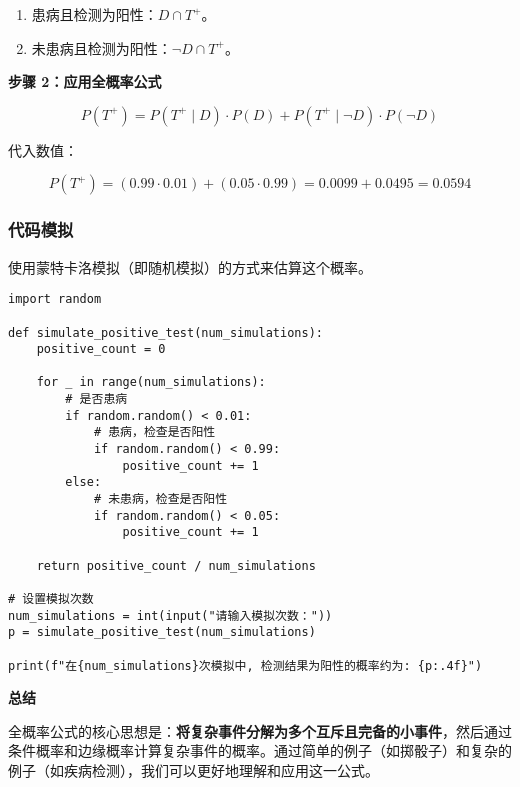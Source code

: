 \documentclass[a4paper]{ctexbook}
\begin{document}
\begin{enumerate}[label=\arabic*.]
\item 患病且检测为阳性：\( D \cap T^+ \)。
\item 未患病且检测为阳性：\( \neg D \cap T^+ \)。
\end{enumerate}

\textbf{步骤 2：应用全概率公式}

\[
P(T^+) = P(T^+ \mid D) \cdot P(D) + P(T^+ \mid \neg D) \cdot P(\neg D)
\]

代入数值：

\[
P(T^+) = (0.99 \cdot 0.01) + (0.05 \cdot 0.99) = 0.0099 + 0.0495 = 0.0594
\]


\subsubsection*{代码模拟}

使用蒙特卡洛模拟（即随机模拟）的方式来估算这个概率。

\begin{verbatim}
import random

def simulate_positive_test(num_simulations):
    positive_count = 0

    for _ in range(num_simulations):
        # 是否患病
        if random.random() < 0.01:
            # 患病，检查是否阳性
            if random.random() < 0.99:
                positive_count += 1
        else:
            # 未患病，检查是否阳性
            if random.random() < 0.05:
                positive_count += 1

    return positive_count / num_simulations

# 设置模拟次数
num_simulations = int(input("请输入模拟次数："))
p = simulate_positive_test(num_simulations)

print(f"在{num_simulations}次模拟中, 检测结果为阳性的概率约为: {p:.4f}")
\end{verbatim}

\textbf{总结}

全概率公式的核心思想是：\textbf{将复杂事件分解为多个互斥且完备的小事件}，然后通过条件概率和边缘概率计算复杂事件的概率。通过简单的例子（如掷骰子）和复杂的例子（如疾病检测），我们可以更好地理解和应用这一公式。
\end{document}
